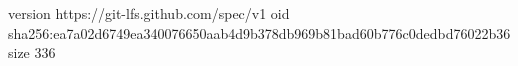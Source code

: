 version https://git-lfs.github.com/spec/v1
oid sha256:ea7a02d6749ea340076650aab4d9b378db969b81bad60b776c0dedbd76022b36
size 336
